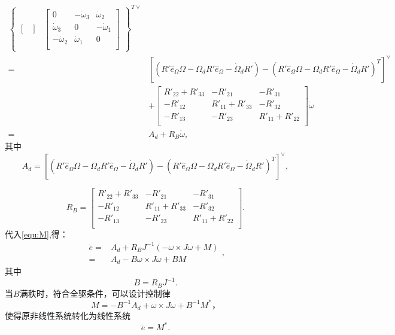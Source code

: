 $$\begin{aligned}
\begin{Bmatrix}
\begin{bmatrix}
        \end{bmatrix}&\begin{bmatrix}
        0 & -\dot\omega_3 &\dot\omega_2  \\
         \dot\omega_3& 0 &  -\dot\omega_1\\
         -\dot\omega_2&\dot\omega_1  & 0 \\
        \end{bmatrix}\end{Bmatrix}^{T\vee}\\
        =&[(R' \hat e_\Omega \Omega  -\Omega_d R' \hat e_\Omega -\dot \Omega_d R')-(R' \hat e_\Omega \Omega  -\Omega_d R' \hat e_\Omega -\dot \Omega_d R')^T]^\vee \\
        & +        \begin{bmatrix}
        R'_{22}+R'_{33} & -R'_{21} & -R'_{31} \\
         -R'_{12}& R'_{11}+R'_{33} & -R'_{32} \\
         -R'_{13}&- R'_{23} & R'_{11}+R'_{22} \\
        \end{bmatrix}\dot \omega\\
        =&A_d+R_B\dot \omega,
        \end{aligned}  $$
其中$$A_d=[(R' \hat e_\Omega \Omega  -\Omega_d R' \hat e_\Omega -\dot \Omega_d R')-(R' \hat e_\Omega \Omega  -\Omega_d R' \hat e_\Omega -\dot \Omega_d R')^T]^\vee,$$

        $$R_B=\begin{bmatrix}
            R'_{22}+R'_{33} & -R'_{21} & -R'_{31} \\
             -R'_{12}& R'_{11}+R'_{33} & -R'_{32} \\
             -R'_{13}&- R'_{23} & R'_{11}+R'_{22} \\
            \end{bmatrix}.$$
代入\ref{equ:M},得：
$$\begin{aligned}
        \ddot e=&A_d+R_B J^{-1}(-\omega \times J\omega+M)\\
        =&A_d-B \omega\times J\omega +BM
        \end{aligned},$$
其中$$B=R_BJ^{-1}.$$
当$B$满秩时，符合全驱条件，可以设计控制律
$$M=-B^{-1} A_d+\omega \times J\omega +B^{-1}M^*，$$
使得原非线性系统转化为线性系统
    $$\ddot e=M^*.$$

